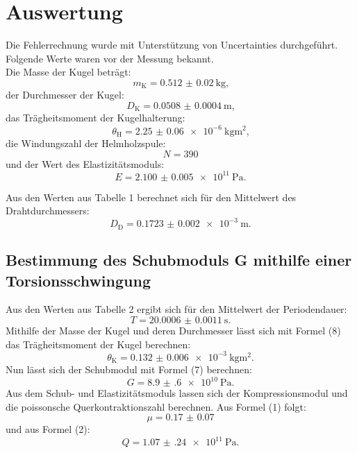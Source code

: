 
\section{Auswertung}
\label{sec:Auswertung}
Die Fehlerrechnung wurde mit Unterstützung von Uncertainties \cite{uncertainties} durchgeführt.
Folgende Werte waren vor der Messung bekannt.\\
Die Masse der Kugel beträgt:
\begin{displaymath}
	m_\text{K} = \SI{0.512(20)}{\kilogram}\text{,}
\end{displaymath}
der Durchmesser der Kugel:
\begin{displaymath}
	D_\text{K} = \SI{0.0508(4)}{\meter}\text{,}
\end{displaymath}
das Trägheitsmoment der Kugelhalterung:  
\begin{displaymath}
	\theta_\text{H} = \SI{2.25(6)e-6}{\kilogram\meter\squared}\text{,}
\end{displaymath}
die Windungszahl der Helmholzspule:
\begin{displaymath}
	N = \num{390}
\end{displaymath}
und der Wert des Elastizitätsmoduls:  
\begin{displaymath}
	E = \SI{2.100(5)e11}{\pascal}\text{.}
\end{displaymath}

Aus den Werten aus Tabelle 1 berechnet sich für den Mittelwert des Drahtdurchmessers:
\begin{displaymath}
D_\text{D} = \SI{0.1723(20)e-3}{\meter}\text{.}
\end{displaymath}




\subsection{Bestimmung des Schubmoduls G mithilfe einer Torsionsschwingung}

Aus den Werten aus Tabelle 2 ergibt sich für den Mittelwert der Periodendauer:
\begin{displaymath}
	T = \SI{20.0006(11)}{\second}\text{.}
\end{displaymath}
Mithilfe der Masse der Kugel und deren Durchmesser lässt sich mit Formel (8) das Trägheitsmoment der Kugel berechnen:
\begin{displaymath}
	\theta_{\text{K}} = \SI{0.132(6)e-3}{\kilogram\meter\squared}\text{.}
\end{displaymath}
Nun lässt sich der Schubmodul mit Formel (7) berechnen:
\begin{displaymath}
	G = \SI{8.9(6)e10}{\pascal}\text{.}
\end{displaymath}
Aus dem Schub- und Elastizitätsmoduls lassen sich der Kompressionsmodul und die poissonsche Querkontraktionszahl berechnen. Aus Formel (1) folgt:
\begin{displaymath}
	\mu = \num{0.17(7)}
\end{displaymath}
und aus Formel (2):
\begin{displaymath}
	Q = \SI{1.07(24)e11}{\pascal}\text{.}
\end{displaymath}








